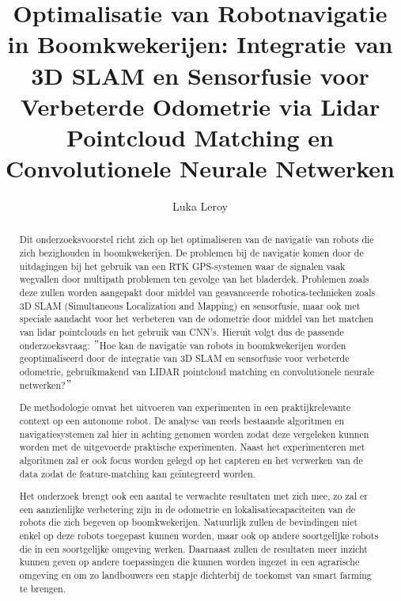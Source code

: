 \documentclass{hogent-article}
\title{Optimalisatie van Robotnavigatie in Boomkwekerijen: Integratie van 3D SLAM en Sensorfusie voor Verbeterde Odometrie via Lidar Pointcloud Matching en Convolutionele Neurale Netwerken}
\author{Luka Leroy}
\begin{document}
\begin{abstract}
  Dit onderzoeksvoorstel richt zich op het optimaliseren van de navigatie van robots die zich bezighouden in boomkwekerijen.
  De problemen bij de navigatie komen door de uitdagingen bij het gebruik van een RTK GPS-systemen waar de signalen vaak wegvallen door multipath problemen ten gevolge van het bladerdek.
  Problemen zoals deze zullen worden aangepakt door middel van geavanceerde robotica-technieken zoals 3D SLAM (Simultaneous Localization and Mapping) en sensorfusie, maar ook met speciale aandacht voor het verbeteren van de odometrie door middel van het matchen van lidar pointclouds en het gebruik van CNN's.
  Hieruit volgt dus de passende onderzoeksvraag: \("\)Hoe kan de navigatie van robots in boomkwekerijen worden geoptimaliseerd door de integratie van 3D SLAM en sensorfusie voor verbeterde odometrie, gebruikmakend van LIDAR pointcloud matching en convolutionele neurale netwerken?\("\)\newline

  De methodologie omvat het uitvoeren van experimenten in een praktijkrelevante context op een autonome robot.
  De analyse van reeds bestaande algoritmen en navigatiesystemen zal hier in achting genomen worden zodat deze vergeleken kunnen worden met de uitgevoerde praktische experimenten.
  Naast het experimenteren met algoritmen zal er ook focus worden gelegd op het capteren en het verwerken van de data zodat de feature-matching kan geïntegreerd worden.\newline

  Het onderzoek brengt ook een aantal te verwachte resultaten met zich mee, zo zal er een aanzienlijke verbetering zijn in de odometrie en lokalisatiecapaciteiten van de robots die zich begeven op boomkwekerijen.
  Natuurlijk zullen de bevindingen niet enkel op deze robots toegepast kunnen worden, maar ook op andere soortgelijke robots die in een soortgelijke omgeving werken.
  Daarnaast zullen de resultaten meer inzicht kunnen geven op andere toepassingen die kunnen worden ingezet in een agrarische omgeving en om zo landbouwers een stapje dichterbij de toekomst van smart farming te brengen.

\end{abstract}

\tableofcontents



\printbibliography[heading=bibintoc]
\end{document}
